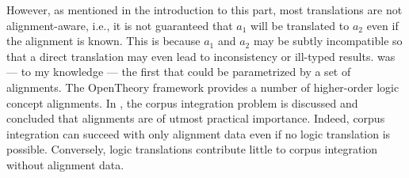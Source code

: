 However, as mentioned in the introduction to this part, most translations are not alignment-aware, i.e., it is not guaranteed that $a_1$ will be translated to $a_2$ even if the alignment is known.
This is because $a_1$ and $a_2$ may be subtly incompatible so that a direct translation may even lead to inconsistency or ill-typed results.
\cite{hol_isahol} was --- to my knowledge --- the first that could be parametrized by a set of alignments. %
The OpenTheory framework \cite{opentheory} provides a number of higher-order logic concept alignments.
In \cite{KR:qed:14}, the corpus integration problem is discussed and concluded that alignments are of utmost practical importance.
Indeed, corpus integration can succeed with only alignment data even if no logic translation is possible.
Conversely, logic translations contribute little to corpus integration without alignment data.

%
%
%

